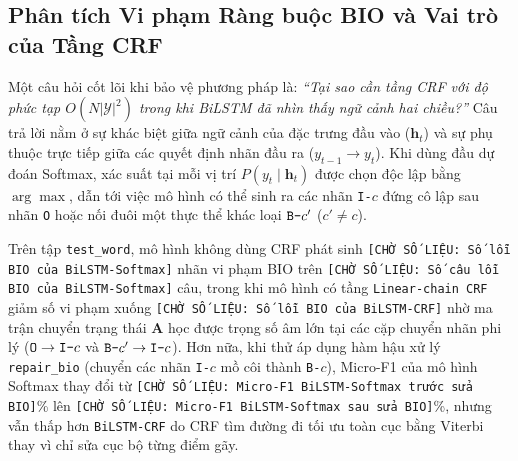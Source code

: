 \documentclass[11pt,a4paper,twocolumn]{article}
\begin{document}



\subsection{Phân tích Vi phạm Ràng buộc BIO và Vai trò của Tầng CRF}
\label{sec:bio_analysis}
Một câu hỏi cốt lõi khi bảo vệ phương pháp là: \textit{``Tại sao cần tầng CRF với độ phức tạp $O(N|\mathcal{Y}|^2)$ trong khi BiLSTM đã nhìn thấy ngữ cảnh hai chiều?''} Câu trả lời nằm ở sự khác biệt giữa ngữ cảnh của đặc trưng đầu vào ($\mathbf{h}_t$) và sự phụ thuộc trực tiếp giữa các quyết định nhãn đầu ra ($y_{t-1} \to y_t$). Khi dùng đầu dự đoán Softmax, xác suất tại mỗi vị trí $P(y_t \mid \mathbf{h}_t)$ được chọn độc lập bằng $\arg\max$, dẫn tới việc mô hình có thể sinh ra các nhãn \texttt{I-}$c$ đứng cô lập sau nhãn \texttt{O} hoặc nối đuôi một thực thể khác loại $\text{\texttt{B-}}c'$ ($c' \ne c$).

Trên tập \texttt{test\_word}, mô hình không dùng CRF phát sinh \texttt{[CHỜ SỐ LIỆU: Số lỗi BIO của BiLSTM-Softmax]} nhãn vi phạm BIO trên \texttt{[CHỜ SỐ LIỆU: Số câu lỗi BIO của BiLSTM-Softmax]} câu, trong khi mô hình có tầng \texttt{Linear-chain CRF} giảm số vi phạm xuống \texttt{[CHỜ SỐ LIỆU: Số lỗi BIO của BiLSTM-CRF]} nhờ ma trận chuyển trạng thái $\mathbf{A}$ học được trọng số âm lớn tại các cặp chuyển nhãn phi lý ($\text{\texttt{O}} \to \text{\texttt{I-}}c$ và $\text{\texttt{B-}}c' \to \text{\texttt{I-}}c$). Hơn nữa, khi thử áp dụng hàm hậu xử lý \texttt{repair\_bio} (chuyển các nhãn \texttt{I-}$c$ mồ côi thành \texttt{B-}$c$), Micro-F1 của mô hình Softmax thay đổi từ \texttt{[CHỜ SỐ LIỆU: Micro-F1 BiLSTM-Softmax trước sửa BIO]}\% lên \texttt{[CHỜ SỐ LIỆU: Micro-F1 BiLSTM-Softmax sau sửa BIO]}\%, nhưng vẫn thấp hơn \texttt{BiLSTM-CRF} do CRF tìm đường đi tối ưu toàn cục bằng Viterbi thay vì chỉ sửa cục bộ từng điểm gãy.
\end{document}

